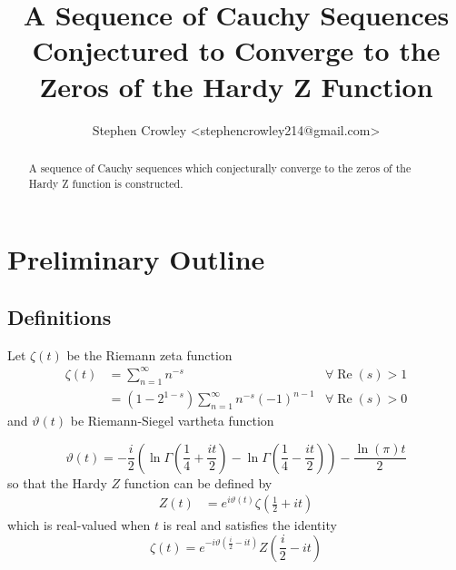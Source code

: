 \documentclass{article}
\newcommand{\tmop}[1]{\ensuremath{\operatorname{#1}}}
\begin{document}
\title{A Sequence of Cauchy Sequences Conjectured to Converge to the Zeros of the Hardy Z Function}

\author{
  Stephen Crowley <stephencrowley214@gmail.com>
}

\maketitle

\begin{abstract}
  A sequence of Cauchy sequences which conjecturally converge to the
  zeros of the Hardy Z function is constructed.
\end{abstract}

\section{Preliminary Outline}

\subsection{Definitions}

Let $\zeta (t)$ be the Riemann zeta function
\begin{equation}
  \begin{array}{lll}
    \zeta (t) & = \sum_{n = 1}^{\infty} n^{- s} & \forall \tmop{Re} (s) > 1\\
    & = (1 - 2^{1 - s}) \sum_{n = 1}^{\infty} n^{- s} (- 1)^{n - 1} & \forall
    \tmop{Re} (s) > 0
  \end{array}
\end{equation}
and $\vartheta (t)$ be Riemann-Siegel vartheta function


\begin{equation}
  \vartheta (t) = - \frac{i}{2} \left( \ln \Gamma \left( \frac{1}{4} + \frac{i
  t}{2} \right) - \ln \Gamma \left( \frac{1}{4} - \frac{i t}{2} \right)
  \right) - \frac{\ln (\pi) t}{2} \label{vartheta}
\end{equation}
so that the Hardy $Z$ function{\cite{HardyZ}} can be defined by
\begin{equation}
  \begin{array}{ll}
    Z (t) & = e^{i \vartheta (t)} \zeta \left( \frac{1}{2} + i t \right)
  \end{array} \label{Z}
\end{equation}
which is real-valued when $t$ is real and satisfies the identity
\begin{equation}
  \zeta (t) = e^{- i \vartheta \left( \frac{i}{2} - i t \right)} Z \left(
  \frac{i}{2} - i t \right) \label{Zz}
\end{equation}
\end{document}
